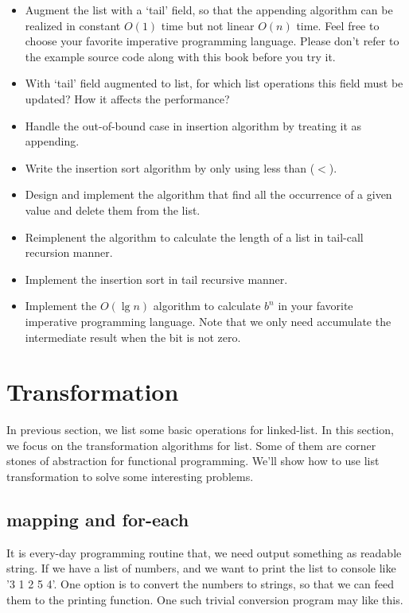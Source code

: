 \documentclass[b5paper]{article}
\begin{document}
\begin{Exercise}
\begin{itemize}
\item Augment the list with a `tail' field, so that the appending algorithm can be realized in constant $O(1)$ time but
not linear $O(n)$ time. Feel free to choose your favorite imperative programming language. Please don't refer to the
example source code along with this book before you try it.
\item With `tail' field augmented to list, for which list operations this field must be updated? How it affects the
performance?
\item Handle the out-of-bound case in insertion algorithm by treating it as appending.
\item Write the insertion sort algorithm by only using less than ($<$).
\item Design and implement the algorithm that find all the occurrence of a given value and delete them from the list.
\item Reimplenent the algorithm to calculate the length of a list in tail-call recursion manner.
\item Implement the insertion sort in tail recursive manner.
\item Implement the $O(\lg n)$ algorithm to calculate $b^n$ in your favorite imperative programming language. Note that
we only need accumulate the intermediate result when the bit is not zero.
\end{itemize}
\end{Exercise}

\section{Transformation}
In previous section, we list some basic operations for linked-list. In this section, we focus on the transformation
algorithms for list. Some of them are corner stones of abstraction for functional programming. We'll show how to use
list transformation to solve some interesting problems.

\subsection{mapping and for-each}
It is every-day programming routine that, we need output something as readable string. If we have a list of numbers, and
we want to print the list to console like '3 1 2 5 4'. One option is to convert the numbers to strings, so that we
can feed them to the printing function. One such trivial conversion program may like this.
\end{document}
